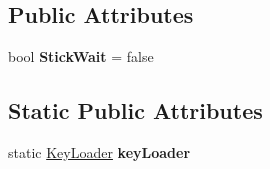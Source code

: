 \subsection*{Public Attributes}
\begin{DoxyCompactItemize}
\item 
\mbox{\label{class_key_loader_a6c392829538b06c0d84df495cc7a4c50}} 
bool {\bfseries Stick\+Wait} = false
\end{DoxyCompactItemize}
\subsection*{Static Public Attributes}
\begin{DoxyCompactItemize}
\item 
\mbox{\label{class_key_loader_abf3ee8be79d04708e5db15e3fe6ee604}} 
static \hyperlink{class_key_loader}{Key\+Loader} {\bfseries key\+Loader}
\end{DoxyCompactItemize}
